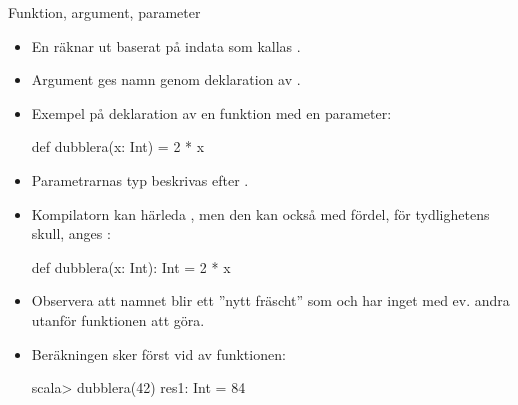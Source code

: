 \documentclass{simpleslides}
\begin{document}
    \begin{Slide}{Funktion, argument, parameter}\SlideFontSmall
    \begin{itemize}
    \item En  räknar ut  baserat på indata som kallas .
    
    \item Argument ges namn genom deklaration av .
    
    \item Exempel på deklaration av en funktion med en parameter:
    \begin{Code}
    def dubblera(x: Int) = 2 * x
    \end{Code}
    
    \item Parametrarnas typ  beskrivas efter .
    \item Kompilatorn kan härleda , men den kan också med fördel, för tydlighetens skull, anges :
    \begin{Code}
    def dubblera(x: Int): Int = 2 * x
    \end{Code}
    
    \item Observera att namnet  blir ett ''nytt fräscht''  som  och har inget med ev. andra  utanför funktionen att göra.
    
    \item Beräkningen sker först vid  av funktionen:
    \begin{REPL}
    scala> dubblera(42)
    res1: Int = 84
    \end{REPL}
    
    \end{itemize}
    \end{Slide}
    
    
    
    
    
\end{document}
